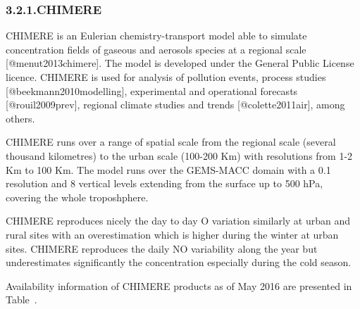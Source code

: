 \documentclass[9pt]{report}
\begin{document}
\begin{table}[h!]
\begin{mdbmarginx}{}{}{}{}
\begin{mdcenter}
{{%
\mdhr{}%

\noindent{}%
}}%
\end{mdcenter}\label{models-2}%
\end{mdbmarginx}%
\end{table}%

\subsubsection{3.2.1.\hspace*{0.5em}CHIMERE}\label{sec-chimere}%

\noindent{}CHIMERE is an Eulerian chemistry-transport model able to simulate concentration ﬁelds of gaseous and aerosols species at a regional scale [@menut2013chimere].
The model is developed under the General Public License licence. CHIMERE is used for analysis of pollution events, process studies [@beekmann2010modelling], experimental and operational forecasts [@rouil2009prev], regional climate studies and trends [@colette2011air], among others.%

CHIMERE runs over a range of spatial scale from the regional scale (several thousand kilometres) to the urban scale (100-200 Km) with resolutions from 1-2 Km to 100 Km.
The model runs over the GEMS-MACC domain with a 0.1\textdegree{} resolution and 8 vertical levels extending from the surface up to 500 hPa, covering the whole troposhphere.%

CHIMERE reproduces nicely the day to day O variation similarly at urban and rural sites with an overestimation which is higher during the winter at urban sites.
CHIMERE reproduces the daily NO variability along the year but underestimates significantly the concentration especially during the cold season.%

Availability information of CHIMERE products as of May 2016 are presented in Table~.%
\end{document}
